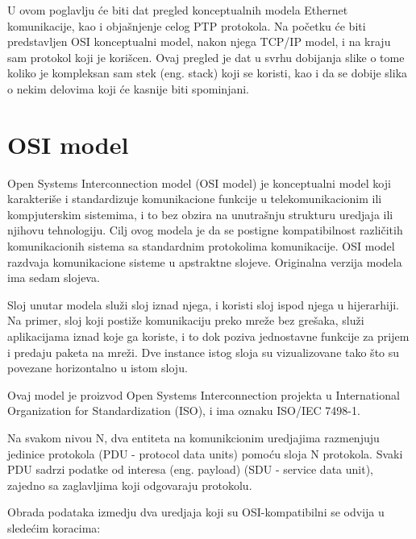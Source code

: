 \documentclass[a4paper,12pt, master]{etf}
\begin{document}
	U ovom poglavlju \'{c}e biti dat pregled konceptualnih modela Ethernet
	komunikacije, kao i obja\v{s}njenje	celog PTP protokola. Na po\v{c}etku
	\'{c}e biti predstavljen OSI konceptualni model, nakon njega TCP/IP	model,
	i na kraju sam protokol koji je kori\v{s}cen. Ovaj pregled je dat u svrhu
	dobijanja slike o tome koliko je kompleksan sam stek (eng\@. stack) koji se
    koristi, kao i da se dobije slika o nekim delovima koji \'{c}e kasnije biti
    spominjani.

	\section{OSI model}

	Open Systems Interconnection model (OSI model) je konceptualni model koji
	karakteri\v{s}e i standardizuje komunikacione funkcije u telekomunikacionim
	ili kompjuterskim sistemima, i to bez obzira na unutra\v{s}nju strukturu
	uredjaja ili njihovu tehnologiju. Cilj ovog modela je da se postigne
	kompatibilnost razli\v{c}itih komunikacionih sistema sa standardnim
	protokolima komunikacije. OSI model razdvaja komunikacione sisteme u
	apstraktne slojeve.	Originalna verzija modela ima sedam slojeva.

	Sloj unutar modela slu\v{z}i sloj iznad njega, i koristi sloj ispod njega u
	hijerarhiji. Na	primer, sloj koji posti\v{z}e komunikaciju preko mre\v{z}e
	bez gre\v{s}aka, slu\v{z}i aplikacijama iznad koje ga koriste, i to dok
	poziva jednostavne funkcije za prijem i predaju paketa na mre\v{z}i.
	Dve instance istog sloja su vizualizovane tako \v{s}to su povezane
	horizontalno u istom sloju.

	Ovaj model je proizvod Open Systems Interconnection projekta u
	International Organization for Standardization (ISO), i ima oznaku ISO/IEC
	7498-1.

	Na svakom nivou N, dva entiteta na komunikcionim uredjajima razmenjuju
	jedinice protokola (PDU - protocol data units) pomo\'{c}u sloja N
	protokola. Svaki PDU sadrzi podatke od interesa (eng\@. payload) (SDU -
    service data unit), zajedno sa zaglavljima koji odgovaraju protokolu.

	Obrada podataka izmedju dva uredjaja koji su OSI-kompatibilni se odvija u
	slede\'{c}im koracima:
\end{document}
